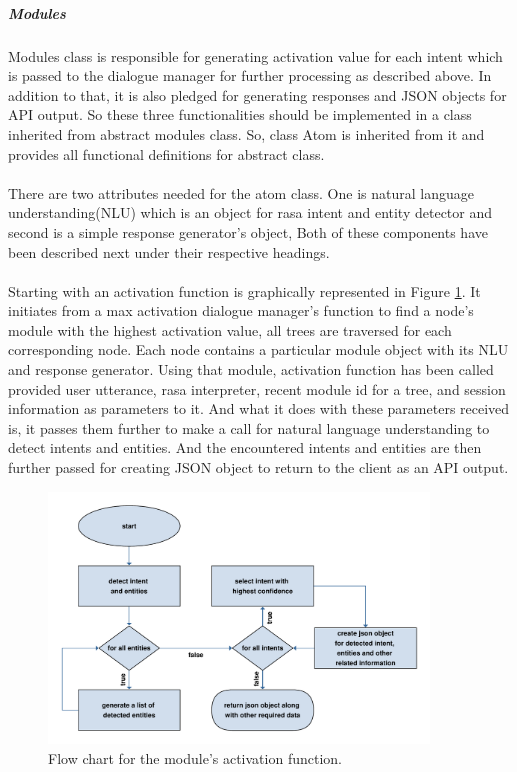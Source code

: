 \subparagraph*{Modules} Modules class is responsible for generating activation value for each intent which is passed to the dialogue manager for further processing as described above. In addition to that, it is also pledged for generating responses and JSON objects for API output. So these three functionalities should be implemented in a class inherited from abstract modules class. So, class Atom is inherited from it and provides all functional definitions for abstract class. 
\\~\\
There are two attributes needed for the atom class. One is natural language understanding(NLU) which is an object for rasa intent and entity detector and second is a simple response generator's object, Both of these components have been described next under their respective headings. 
\\~\\
Starting with an activation function is graphically represented in Figure \ref{fig:flowModule}. It initiates from a max activation dialogue manager's function to find a node's module with the highest activation value, all trees are traversed for each corresponding node. Each node contains a particular module object with its NLU and response generator. Using that module, activation function has been called provided user utterance, rasa interpreter, recent module id for a tree, and session information as parameters to it. And what it does with these parameters received is, it passes them further to make a call for natural language understanding to detect intents and entities. And the encountered intents and entities are then further passed for creating JSON object to return to the client as an API output. 

\begin{figure}[!h]
    \centering
    \includegraphics[width=0.9\textwidth]{img/module.pdf}
    \caption{Flow chart for the module's activation function.}
    \label{fig:flowModule}
\end{figure}

